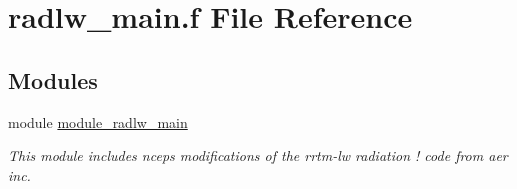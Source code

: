 \hypertarget{radlw__main_8f}{}\section{radlw\+\_\+main.\+f File Reference}
\label{radlw__main_8f}
\subsection*{Modules}
\begin{DoxyCompactItemize}
\item 
module \hyperlink{namespacemodule__radlw__main}{module\+\_\+radlw\+\_\+main}
\begin{DoxyCompactList}\small\item\em This module includes ncep\textquotesingle{}s modifications of the rrtm-\/lw radiation ! code from aer inc. \end{DoxyCompactList}\end{DoxyCompactItemize}
